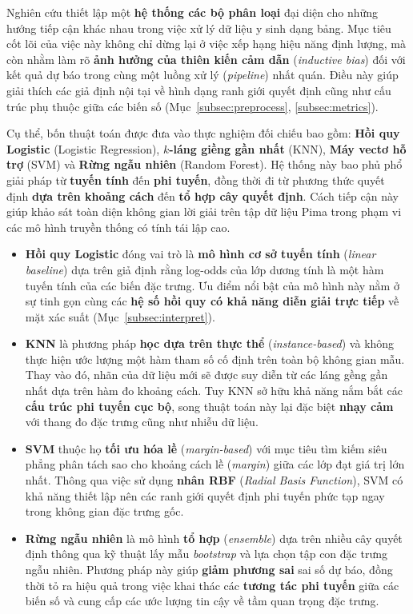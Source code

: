\documentclass[14pt,a4paper]{extreport}
\begin{document}
Nghiên cứu thiết lập một \textbf{hệ thống các bộ phân loại} đại diện cho những hướng tiếp cận khác nhau trong việc xử lý dữ liệu y sinh dạng bảng. Mục tiêu cốt lõi của việc này không chỉ dừng lại ở việc xếp hạng hiệu năng định lượng, mà còn nhằm làm rõ \textbf{ảnh hưởng của thiên kiến cảm dẫn} (\textit{inductive bias}) đối với kết quả dự báo trong cùng một luồng xử lý (\textit{pipeline}) nhất quán. Điều này giúp giải thích các giả định nội tại về hình dạng ranh giới quyết định cũng như cấu trúc phụ thuộc giữa các biến số (Mục~\ref{subsec:preprocess}, \ref{subsec:metrics}).

Cụ thể, bốn thuật toán được đưa vào thực nghiệm đối chiếu bao gồm: \textbf{Hồi quy Logistic} (Logistic Regression), \textbf{$k$-láng giềng gần nhất} (KNN), \textbf{Máy vectơ hỗ trợ} (SVM) và \textbf{Rừng ngẫu nhiên} (Random Forest). Hệ thống này bao phủ phổ giải pháp từ \textbf{tuyến tính} đến \textbf{phi tuyến}, đồng thời đi từ phương thức quyết định \textbf{dựa trên khoảng cách} đến \textbf{tổ hợp cây quyết định}. Cách tiếp cận này giúp khảo sát toàn diện không gian lời giải trên tập dữ liệu Pima trong phạm vi các mô hình truyền thống có tính tái lập cao.\cite{pedregosa2011,sisodia2018}

\begin{itemize}
  \item \textbf{Hồi quy Logistic} đóng vai trò là \textbf{mô hình cơ sở tuyến tính} (\textit{linear baseline}) dựa trên giả định rằng log-odds của lớp dương tính là một hàm tuyến tính của các biến đặc trưng. Ưu điểm nổi bật của mô hình này nằm ở sự tinh gọn cùng các \textbf{hệ số hồi quy có khả năng diễn giải trực tiếp} về mặt xác suất (Mục~\ref{subsec:interpret}).
  
  \item \textbf{KNN} là phương pháp \textbf{học dựa trên thực thể} (\textit{instance-based}) và không thực hiện ước lượng một hàm tham số cố định trên toàn bộ không gian mẫu. Thay vào đó, nhãn của dữ liệu mới sẽ được suy diễn từ các láng gềng gần nhất dựa trên hàm đo khoảng cách. Tuy KNN sở hữu khả năng nắm bắt các \textbf{cấu trúc phi tuyến cục bộ}, song thuật toán này lại đặc biệt \textbf{nhạy cảm} với thang đo đặc trưng cũng như nhiễu dữ liệu.
  
  \item \textbf{SVM} thuộc họ \textbf{tối ưu hóa lề} (\textit{margin-based}) với mục tiêu tìm kiếm siêu phẳng phân tách sao cho khoảng cách lề (\textit{margin}) giữa các lớp đạt giá trị lớn nhất. Thông qua việc sử dụng \textbf{nhân RBF} (\textit{Radial Basis Function}), SVM có khả năng thiết lập nên các ranh giới quyết định phi tuyến phức tạp ngay trong không gian đặc trưng gốc. 
  
  \item \textbf{Rừng ngẫu nhiên} là mô hình \textbf{tổ hợp} (\textit{ensemble}) dựa trên nhiều cây quyết định thông qua kỹ thuật lấy mẫu \textit{bootstrap} và lựa chọn tập con đặc trưng ngẫu nhiên. Phương pháp này giúp \textbf{giảm phương sai} sai số dự báo, đồng thời tỏ ra hiệu quả trong việc khai thác các \textbf{tương tác phi tuyến} giữa các biến số và cung cấp các ước lượng tin cậy về tầm quan trọng đặc trưng.
\end{itemize}
\end{document}

